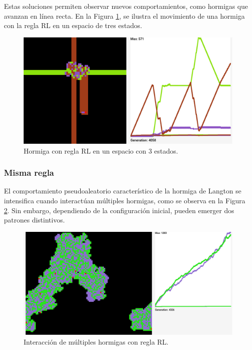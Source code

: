 \documentclass[12pt,twoside]{article}
\begin{document}
Estas soluciones permiten observar nuevos comportamientos, como hormigas que avanzan en línea recta. En la Figura \ref{img:rl_3}, se ilustra el movimiento de una hormiga con la regla RL en un espacio de tres estados.

\begin{figure}[H]
	\centering
	\includegraphics[width=\textwidth]{img/rl_3d.png}
	\caption{Hormiga con regla RL en un espacio con 3 estados.}
	\label{img:rl_3}
\end{figure}

\subsubsection{Misma regla}

El comportamiento pseudoaleatorio característico de la hormiga de Langton se intensifica cuando interactúan múltiples hormigas, como se observa en la Figura \ref{img:mul1}. Sin embargo, dependiendo de la configuración inicial, pueden emerger dos patrones distintivos. 

\begin{figure}[h]
	\centering
	\includegraphics[width=\textwidth]{img/mul1.png}
	\caption{Interacción de múltiples hormigas con regla RL.}
	\label{img:mul1}
\end{figure}
\end{document}
